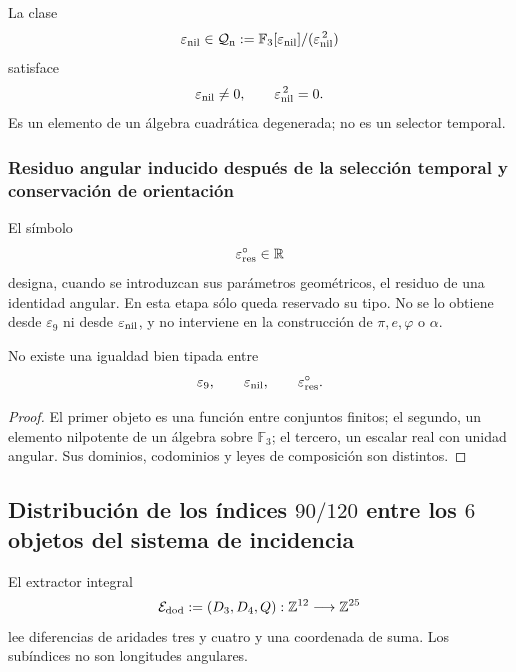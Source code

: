 {La clase
\begin{equation}
 \varepsilon_{\rm nil}
 \in
 \mathcal Q_{\rm n}:=
 \mathbb F_3[\varepsilon_{\rm nil}]
 /(\varepsilon_{\rm nil}^{\,2})
 \label{p12-83-c1-s7:eq:u006e-epsilon-nilpotente}
\end{equation}
satisface
\begin{equation}
 \varepsilon_{\rm nil}\neq0,
 \qquad
 \varepsilon_{\rm nil}^{\,2}=0.
 \label{p12-83-c1-s7:eq:u006e-epsilon-nilpotente-relacion}
\end{equation}
Es un elemento de un álgebra cuadrática degenerada; no es un selector
temporal.

\subsubsection{Residuo angular inducido después de la selección temporal y conservación de orientación}

El símbolo
\begin{equation}
 \varepsilon_{\rm res}^{\circ}\in\mathbb R
 \label{p12-83-c1-s7:eq:u006e-epsilon-residual-tipo}
\end{equation}
designa, cuando se introduzcan sus parámetros geométricos, el residuo de una
identidad angular. En esta etapa sólo queda reservado su tipo. No se lo
obtiene desde \(\varepsilon_9\) ni desde
\(\varepsilon_{\rm nil}\), y no interviene en la construcción de
\(\pi,e,\varphi\) o \(\alpha\).

\begin{proposition}
\label{p12-83-c1-s7:prop:u006e-no-identificacion-epsilon}
No existe una igualdad bien tipada entre
\[
 \varepsilon_9,\qquad
 \varepsilon_{\rm nil},\qquad
 \varepsilon_{\rm res}^{\circ}.
\]
\end{proposition}

\begin{proof}
El primer objeto es una función entre conjuntos finitos; el segundo, un
elemento nilpotente de un álgebra sobre \(\mathbb F_3\); el tercero, un
escalar real con unidad angular. Sus dominios, codominios y leyes de
composición son distintos.
\end{proof}

\subsection{Distribución de los índices \(90/120\) entre los \(6\) objetos del sistema de incidencia}

\begin{definition}
\label{p12-83-c1-s7:def:u006e-extractor-dodecafasico}
El extractor integral
\begin{equation}
 \mathcal E_{\rm dod}:=(D_3,D_4,Q):
 \mathbb Z^{12}\longrightarrow\mathbb Z^{25}
 \label{p12-83-c1-s7:eq:u006e-extractor-dodecafasico}
\end{equation}
lee diferencias de aridades tres y cuatro y una coordenada de suma. Los
subíndices no son longitudes angulares.
\end{definition}

}
